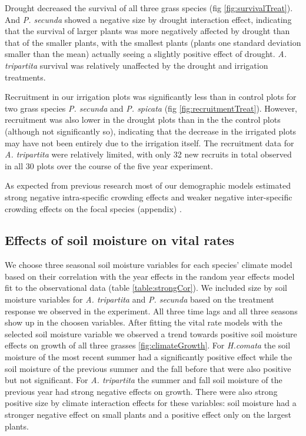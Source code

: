 \documentclass[11pt]{article}
\begin{document}
\begin{doublespacing}
Drought decreased the survival of all three grass species (fig \ref{fig:survivalTreat}). And \textit{P. secunda} showed a negative size by drought interaction effect, indicating that the survival of larger plants was more negatively affected by drought than that of the smaller plants, with the smallest plants (plants one standard deviation smaller than the mean) actually seeing a slightly positive effect of drought. \textit{A. tripartita} survival was relatively unaffected by the drought and irrigation treatments.

Recruitment in our irrigation plots was significantly less than in control plots for two grass species \textit{P. secunda} and \textit{P. spicata} (fig \ref{fig:recruitmentTreat}). However, recruitment was also lower in the drought plots than in the the control plots (although not significantly so), indicating that the decrease in the irrigated plots may have not been entirely due to the irrigation itself. The recruitment data for \textit{A. tripartita} were relatively limited, with only 32 new recruits in total observed in all 30 plots over the course of the five year experiment.

As expected from previous research most of our demographic models estimated strong negative intra-specific crowding effects and weaker negative inter-specific crowding effects on the focal species (appendix) \citep{adler_coexistence_2010,chu_direct_2016,chu_large_2015}.

\subsection*{Effects of soil moisture on vital rates}

We choose three seasonal soil moisture variables for each species' climate model based on their correlation with the year effects in the random year effects model fit to the observational data (table \ref{table:strongCor}). We included size by soil moisture variables for \textit{A. tripartita} and  \textit{P. secunda} based on the treatment response we observed in the experiment. All three time lags and all three seasons show up in the choosen variables. After fitting the vital rate models with the selected soil moisture variable we observed a trend towards positive soil moisture effects on growth of all three grasses \ref{fig:climateGrowth}. For \textit{H.comata} the soil moisture of the most recent summer had a significantly positive effect while the soil moisture of the previous summer and the fall before that were also positive but not significant. For \textit{A. tripartita} the summer and fall soil moisture of the previous year had strong negative effects on growth.  There were also strong positive size by climate interaction effects for these variables: soil moisture had a stronger negative effect on small plants and a positive effect only on the largest plants.


\end{doublespacing}
\end{document}
